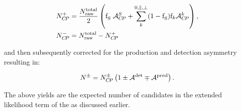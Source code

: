 \begin{subequations}
  \label{acp_yields}
  \begin{align}
    N^{+}_{C\!P} &= \frac{ N_{\text{raw}}^{\text{total}} }{2} \left( \text{f}_{\text{S}}^{}\; \mathcal{A}_{C\!P}^{S} + \sum_k^{0,\parallel,\perp} (1-\text{f}_{\text{S}}^{})\text{f}_{k}\mathcal{A}_{C\!P}^{k}  \right), \\
    N^{-}_{C\!P} &=  N_{\text{raw}}^{\text{total}} - N^{+}_{C\!P}
  \end{align}
\end{subequations}

\noindent and then subsequently corrected for the production and detection asymmetry resulting in:

\begin{equation}
N^{\pm} = N^{\pm}_{C\!P}  \left( 1 \pm \mathcal{A}^{\text{det}} \mp \mathcal{A}^{\text{prod}} \right).
\label{norm_yields}
\end{equation}

\noindent The above yields are the expected number of candidates in the extended likelihood term of the \pdfs as discussed earlier.
